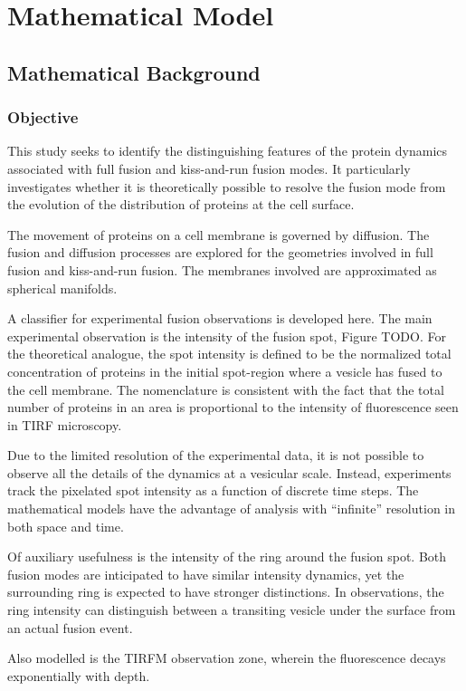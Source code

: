 \documentclass{report}
\begin{document}
\part{Mathematical Model}

\chapter{Mathematical Background}
\section{Objective}
This study seeks to identify the distinguishing features of the protein dynamics associated with full fusion and kiss-and-run fusion modes. It particularly investigates whether it is theoretically possible to resolve the fusion mode from the evolution of the distribution of proteins at the cell surface.

The movement of proteins on a cell membrane is governed by diffusion. The fusion and diffusion processes are explored for the geometries involved in full fusion and kiss-and-run fusion. The membranes involved are approximated as spherical manifolds.

A classifier for experimental fusion observations is developed here. The main experimental observation is the intensity of the fusion spot, Figure TODO. For the theoretical analogue, the spot intensity is defined to be the normalized total concentration of proteins in the initial spot-region where a vesicle has fused to the cell membrane. The nomenclature is consistent with the fact that the total number of proteins in an area is proportional to the intensity of fluorescence seen in TIRF microscopy.

Due to the limited resolution of the experimental data, it is not possible to observe all the details of the dynamics at a vesicular scale. Instead, experiments track the pixelated spot intensity as a function of discrete time steps. The mathematical models have the advantage of analysis with ``infinite'' resolution in both space and time.

Of auxiliary usefulness is the intensity of the ring around the fusion spot. Both fusion modes are inticipated to have similar intensity dynamics, yet the surrounding ring is expected to have stronger distinctions. In observations, the ring intensity can distinguish between a transiting vesicle under the surface from an actual fusion event.

Also modelled is the TIRFM observation zone, wherein the fluorescence decays exponentially with depth.
\end{document}
